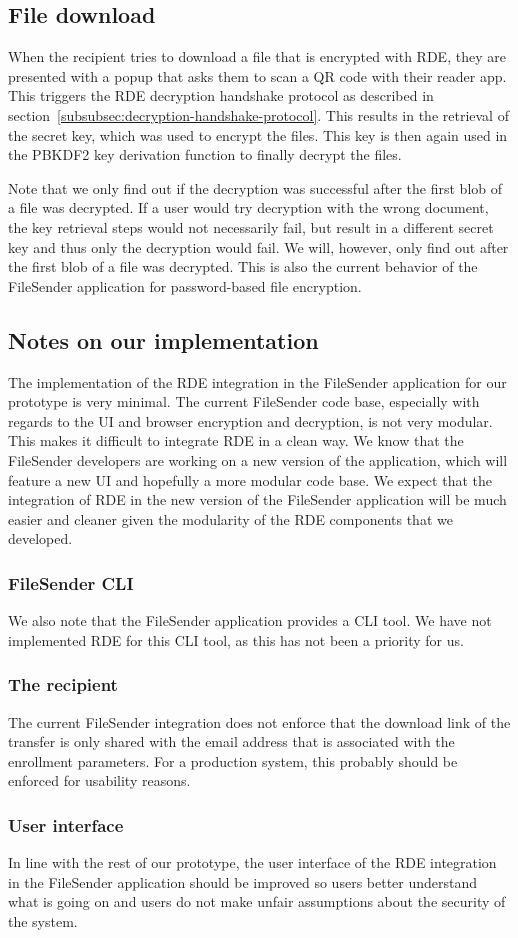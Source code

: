 \subsection{File download}\label{subsec:file-download}
When the recipient tries to download a file that is encrypted with RDE, they are presented with a popup that asks them to scan a QR code with their reader app.
This triggers the RDE decryption handshake protocol as described in section~\ref{subsubsec:decryption-handshake-protocol}.
This results in the retrieval of the secret key, which was used to encrypt the files.
This key is then again used in the PBKDF2 key derivation function to finally decrypt the files.

Note that we only find out if the decryption was successful after the first blob of a file was decrypted.
If a user would try decryption with the wrong document, the key retrieval steps would not necessarily fail, but result in a different secret key and thus only the decryption would fail.
We will, however, only find out after the first blob of a file was decrypted.
This is also the current behavior of the FileSender application for password-based file encryption.

\subsection{Notes on our implementation}\label{subsec:notes-on-our-implementation}
The implementation of the RDE integration in the FileSender application for our prototype is very minimal.
The current FileSender code base, especially with regards to the UI and browser encryption and decryption, is not very modular.
This makes it difficult to integrate RDE in a clean way.
We know that the FileSender developers are working on a new version of the application, which will feature a new UI and hopefully a more modular code base.
We expect that the integration of RDE in the new version of the FileSender application will be much easier and cleaner given the modularity of the RDE components that we developed.

\subsubsection{FileSender CLI}
We also note that the FileSender application provides a CLI tool.
We have not implemented RDE for this CLI tool, as this has not been a priority for us.

\subsubsection{The recipient}
The current FileSender integration does not enforce that the download link of the transfer is only shared with the email address that is associated with the enrollment parameters.
For a production system, this probably should be enforced for usability reasons.

\subsubsection{User interface}
In line with the rest of our prototype, the user interface of the RDE integration in the FileSender application should be improved so users better understand what is going on and users do not make unfair assumptions about the security of the system.

